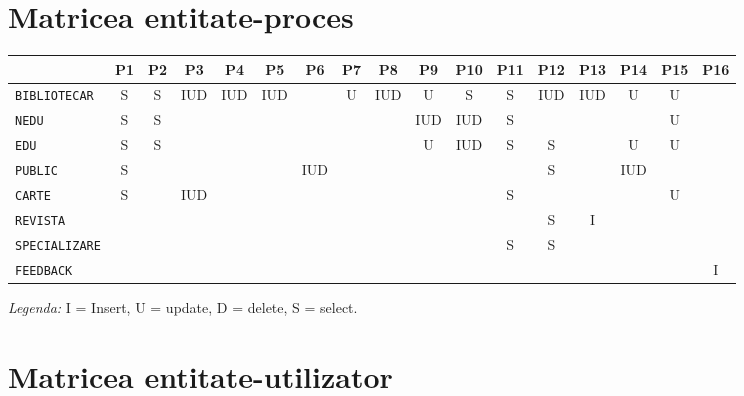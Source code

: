 

\section{Matricea entitate-proces}
\label{sec:matr-ep}

\begin{center}
  \footnotesize
  \begin{tabular}{|l|c|c|c|c|c|c|c|c|c|c|c|c|c|c|c|c|}
    \hline
    & P1 & P2 & P3 & P4 & P5 & P6 & P7 & P8 & P9 & P10 & P11 & P12 & P13 & P14 & P15 & P16 \\
    \hline \hline
    \texttt{BIBLIOTECAR} & S & S & IUD & IUD & IUD & & U & IUD & U & S & S & IUD & IUD & U & U & \\
    \hline
    \texttt{NEDU} & S & S & & & & & & & IUD & IUD & S & & & & U & \\
    \hline
    \texttt{EDU} & S & S & & & & & & & U & IUD & S & S & & U & U & \\
    \hline
    \texttt{PUBLIC} & S & & & & & IUD & & & & & & S & & IUD & & \\
    \hline
    \texttt{CARTE} & S & & IUD & & & & & & & & S & & & & U & \\
    \hline
    \texttt{REVISTA} & & & & & & & & & & & & S & I & & & \\
    \hline
    \texttt{SPECIALIZARE} & & & & & & & & & & & S & S & & & & \\
    \hline
    \texttt{FEEDBACK} & & & & & & & & & & & & & & & & I \\
    \hline
  \end{tabular}
\end{center}

\emph{Legenda:} I = Insert, U = update, D = delete, S = select.


\section{Matricea entitate-utilizator}
\label{sec:matr-eu}

